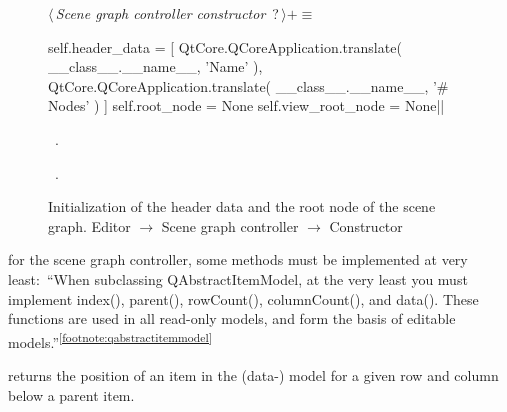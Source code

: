 \documentclass[%
    a4paper,    %
    justified,  %
    nobib,      %
    openany     %
]{tufte-book}
\newcommand{\footref}[1]{\textsuperscript{\ref{#1}}}
\begin{document}
\begin{figure}
\begin{flushleft} \small
\begin{minipage}{\linewidth}\label{scrap30}\raggedright\small
{} $\langle\,${\itshape Scene graph controller constructor}\nobreak\ {\footnotesize {?}}$\,\rangle+\equiv$
\vspace{-1ex}
\begin{pythoncode}
    self.header_data = [
        QtCore.QCoreApplication.translate(
            __class__.__name__, 'Name'
        ),
        QtCore.QCoreApplication.translate(
            __class__.__name__, '# Nodes'
        )
    ]
    self.root_node = None
    self.view_root_node = None|\NWsep|
\end{pythoncode}
\vspace{1.5ex}
\footnotesize
\begin{list}{}{\setlength{\itemsep}{-\parsep}\setlength{\itemindent}{-\leftmargin}}
\item \NWtxtMacroDefBy\ .
\item \NWtxtMacroRefIn\ .

\item{}
\end{list}
\end{minipage}\vspace{4ex}
\end{flushleft}
\caption{Initialization of the header data and the root node of the scene graph.
  \newline{}\newline{}Editor $\rightarrow$ Scene graph controller $\rightarrow$
  Constructor}
\label{editor:lst:scene-graph-controller:constructor:header-data}
\end{figure}


 for the scene graph
controller, some methods must be implemented at very least:~\enquote{When
subclassing QAbstractItemModel, at the very least you must implement index(),
parent(), rowCount(), columnCount(), and data(). These functions are used in all
read-only models, and form the basis of editable
models.}\footref{footnote:qabstractitemmodel}

 returns the position of an item in the (data-)
model for a given row and column below a parent item.
\end{document}
